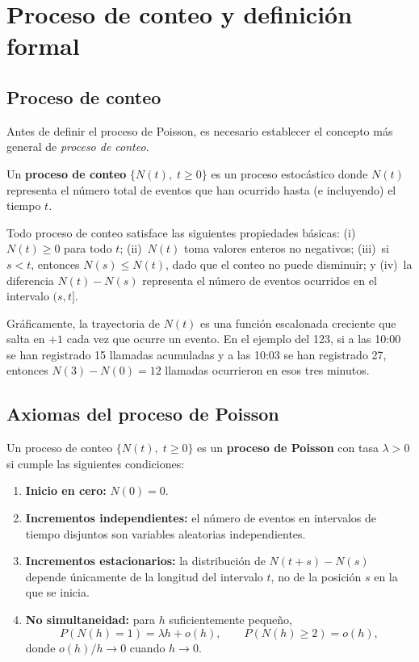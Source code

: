 \documentclass[11pt, letterpaper]{article}
\begin{document}
\section{Proceso de conteo y definición formal}

\subsection{Proceso de conteo}

Antes de definir el proceso de Poisson, es necesario establecer el concepto más general de \emph{proceso de conteo}.

\begin{definicion}
Un \textbf{proceso de conteo} $\{N(t),\; t \geq 0\}$ es un proceso estocástico donde $N(t)$ representa el número total de eventos que han ocurrido hasta (e incluyendo) el tiempo $t$.
\end{definicion}

Todo proceso de conteo satisface las siguientes propiedades básicas: (i)~$N(t) \geq 0$ para todo $t$; (ii)~$N(t)$ toma valores enteros no negativos; (iii)~si $s < t$, entonces $N(s) \leq N(t)$, dado que el conteo no puede disminuir; y (iv)~la diferencia $N(t) - N(s)$ representa el número de eventos ocurridos en el intervalo $(s, t]$.

Gráficamente, la trayectoria de $N(t)$ es una función escalonada creciente que salta en $+1$ cada vez que ocurre un evento. En el ejemplo del 123, si a las 10:00 se han registrado 15 llamadas acumuladas y a las 10:03 se han registrado 27, entonces $N(3)-N(0) = 12$ llamadas ocurrieron en esos tres minutos.

\subsection{Axiomas del proceso de Poisson}

\begin{definicion}
Un proceso de conteo $\{N(t),\; t \geq 0\}$ es un \textbf{proceso de Poisson} con tasa $\lambda > 0$ si cumple las siguientes condiciones:
\begin{enumerate}[label=(\roman*)]
    \item \textbf{Inicio en cero:} $N(0) = 0$.
    \item \textbf{Incrementos independientes:} el número de eventos en intervalos de tiempo disjuntos son variables aleatorias independientes.
    \item \textbf{Incrementos estacionarios:} la distribución de $N(t+s) - N(s)$ depende únicamente de la longitud del intervalo $t$, no de la posición $s$ en la que se inicia.
    \item \textbf{No simultaneidad:} para $h$ suficientemente pequeño,
    \[
        P(N(h)=1) = \lambda h + o(h), \qquad P(N(h) \geq 2) = o(h),
    \]
    donde $o(h)/h \to 0$ cuando $h \to 0$.
\end{enumerate}
\end{definicion}
\end{document}

